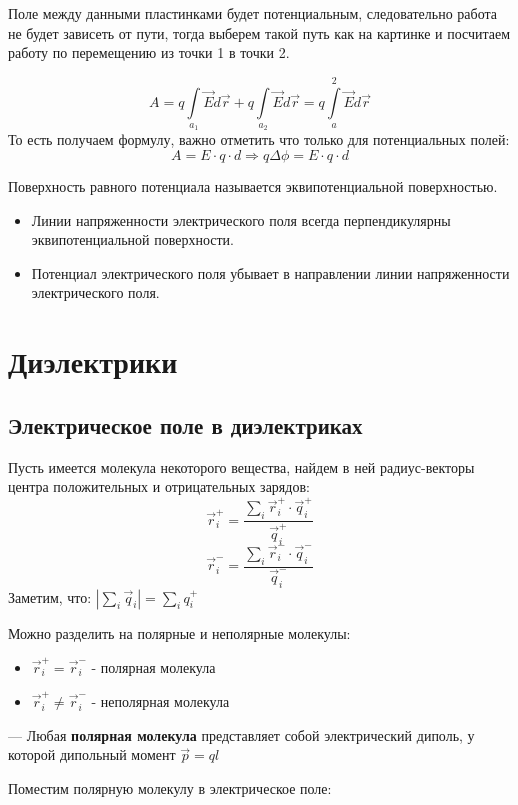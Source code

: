 \documentclass[../main.tex]{subfiles}
\begin{document}
Поле между данными пластинками будет потенциальным, 
следовательно работа не будет зависеть от пути, тогда выберем такой путь как на картинке и посчитаем работу по перемещению из точки 1 в точки 2.

\[A = q \int\limits_{a_1} \vec E d \vec r + q \int\limits_{a_2} \vec E d \vec r = q \int\limits_{a}^{2} \vec E d \vec r\]
То есть получаем формулу, важно отметить что только для потенциальных полей:
\[A = E \cdot q \cdot d \Rightarrow q \Delta \phi = E \cdot q \cdot d\]


 Поверхность равного потенциала называется эквипотенциальной поверхностью.
\begin{itemize}
    \item   Линии напряженности электрического поля всегда перпендикулярны эквипотенциальной поверхности. 
    \item   Потенциал электрического поля убывает в направлении линии напряженности электрического поля.
\end{itemize}
\section{Диэлектрики}
\subsection{Электрическое поле в диэлектриках}
Пусть имеется молекула некоторого вещества, найдем в ней радиус-векторы центра положительных и отрицательных зарядов:
\[\vec r_i^{+} = \frac{\sum_{i} \vec r_i^{+} \cdot \vec q_i^{+}}{\vec q_i^{+}}\]
\[\vec r_i^{-} = \frac{\sum_{i} \vec r_i^{-} \cdot \vec q_i^{-}}{\vec q_i^{-}}\]
Заметим, что: $|\sum_{i} \vec q_i| = \sum_{i} q_i^{+}$

Можно разделить на полярные и неполярные молекулы:
\begin{itemize}
    \item $\vec r_i^{+} = \vec r_i^{-}$ - полярная молекула
    \item $\vec r_i^{+} \neq \vec r_i^{-}$ - неполярная молекула
\end{itemize}
--- Любая \textbf{полярная молекула} представляет собой электрический диполь, у которой дипольный момент $\vec p = ql$

Поместим полярную молекулу в электрическое поле:
\end{document}
